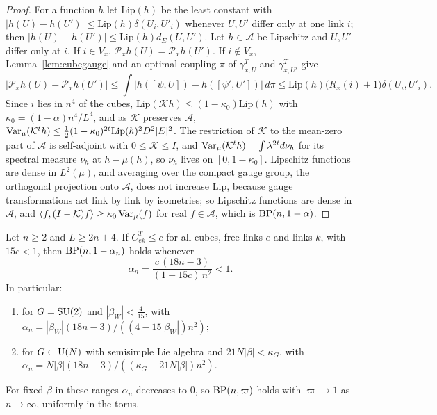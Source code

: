 \begin{proof}
For a function $h$ let $\mathrm{Lip}(h)$ be the least constant with
$|h(U)-h(U')|\le\mathrm{Lip}(h)\delta(U_i,U'_i)$ whenever $U,U'$ differ only at
one link $i$; then $|h(U)-h(U')|\le\mathrm{Lip}(h)d_E(U,U')$. Let $h\in\mathcal A$
be Lipschitz and $U,U'$ differ only at $i$. If $i\in V_x$,
$\mathcal P_xh(U)=\mathcal P_xh(U')$. If $i\notin V_x$, Lemma~\ref{lem:cubegauge}
and an optimal coupling $\pi$ of $\gamma^T_{x,U}$ and $\gamma^T_{x,U'}$ give
\[
|\mathcal P_xh(U)-\mathcal P_xh(U')|\le\int|h([\psi,U])-h([\psi',U'])|\,d\pi
\le\mathrm{Lip}(h)\bigl(R_x(i)+1\bigr)\delta(U_i,U'_i).
\]
Since $i$ lies in $n^4$ of the cubes, $\mathrm{Lip}(\mathcal Kh)\le(1-\kappa_0)
\mathrm{Lip}(h)$ with $\kappa_0=(1-\alpha)n^4/L^4$, and as $\mathcal K$
preserves $\mathcal A$, $\operatorname{Var}_\mu(\mathcal K^th)\le\frac12(1-\kappa_0)^{2t}
\mathrm{Lip}(h)^2D^2|E|^2$. The restriction of $\mathcal K$ to the mean-zero
part of $\mathcal A$ is self-adjoint with $0\le\mathcal K\le I$, and
$\operatorname{Var}_\mu(\mathcal K^th)=\int\lambda^{2t}d\nu_h$ for its spectral measure $\nu_h$
at $h-\mu(h)$, so $\nu_h$ lives on $[0,1-\kappa_0]$. Lipschitz functions are
dense in $L^2(\mu)$, and averaging over the compact gauge group, the
orthogonal projection onto $\mathcal A$, does not increase $\mathrm{Lip}$,
because gauge transformations act link by link by isometries; so Lipschitz
functions are dense in $\mathcal A$, and $\langle f,(I-\mathcal K)f\rangle\ge\kappa_0
\operatorname{Var}_\mu(f)$ for real $f\in\mathcal A$, which is $\mathrm{BP}(n,1-\alpha)$.
\end{proof}

\begin{theorem}\label{thm:bpstrong}
Let $n\ge2$ and $L\ge2n+4$. If $C^T_{ek}\le c$ for all cubes, free links $e$
and links $k$, with $15c<1$, then $\mathrm{BP}(n,1-\alpha_n)$ holds whenever
\[
\alpha_n=\frac{c\,(18n-3)}{(1-15c)\,n^2}<1 .
\]
In particular:
\begin{enumerate}[label=\textup{(\roman*)},leftmargin=*]
\item for $G=\mathrm{SU}(2)$ and $|\beta_W|<\frac4{15}$, with $\alpha_n=|\beta_W|(18n-3)/
((4-15|\beta_W|)n^2)$;
\item for $G\subset\mathrm{U}(N)$ with semisimple Lie algebra and $21N|\beta|<\kappa_G$,
with $\alpha_n=N|\beta|(18n-3)/((\kappa_G-21N|\beta|)n^2)$.
\end{enumerate}
For fixed $\beta$ in these ranges $\alpha_n$ decreases to $0$, so $\mathrm{BP}(n,\varpi)$
holds with $\varpi\to1$ as $n\to\infty$, uniformly in the torus.
\end{theorem}

